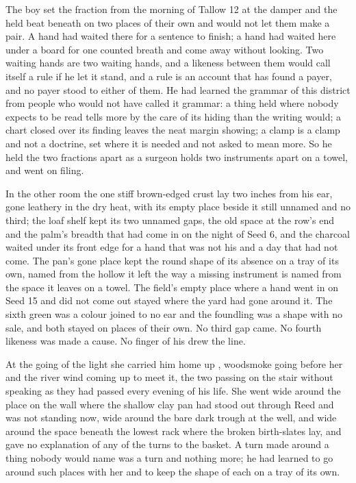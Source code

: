 The boy set the fraction from the morning of Tallow 12 at the damper and the held beat beneath  on two places of their own and would not let them make a pair. A hand had waited there for a sentence to finish; a hand had waited here under a board for one counted breath and come away without looking. Two waiting hands are two waiting hands, and a likeness between them would call itself a rule if he let it stand, and a rule is an account that has found a payer, and no payer stood to either of them. He had learned the grammar of this district from people who would not have called it grammar: a thing held where nobody expects to be read tells more by the care of its hiding than the writing would; a chart closed over its finding leaves the neat margin showing; a clamp is a clamp and not a doctrine, set where it is needed and not asked to mean more. So he held the two fractions apart as a surgeon holds two instruments apart on a towel, and went on filing.

\scenebreak

In the other room the one stiff brown-edged crust lay two inches from his ear, gone leathery in the dry heat, with its empty place beside it still unnamed and no third; the loaf shelf kept its two unnamed gaps, the old space at the row's end and the palm's breadth that had come in on the night of Seed 6, and the charcoal waited under its front edge for a hand that was not his and a day that had not come. The pan's gone place kept the round shape of its absence on a tray of its own, named from the hollow it left the way a missing instrument is named from the space it leaves on a towel. The field's empty place where a hand went in on Seed 15 and did not come out stayed where the yard had gone around it. The sixth green was a colour joined to no ear and the foundling was a shape with no sale, and both stayed on places of their own. No third gap came. No fourth likeness was made a cause. No finger of his drew the line.

At the going of the light she carried him home up , woodsmoke going before her and the river wind coming up to meet it, the two passing on the stair without speaking as they had passed every evening of his life. She went wide around the place on the wall where the shallow clay pan had stood out through Reed and was not standing now, wide around the bare dark trough at the well, and wide around the space beneath the lowest rack where the broken birth-slates lay, and gave no explanation of any of the turns to the basket. A turn made around a thing nobody would name was a turn and nothing more; he had learned to go around such places with her and to keep the shape of each on a tray of its own.

